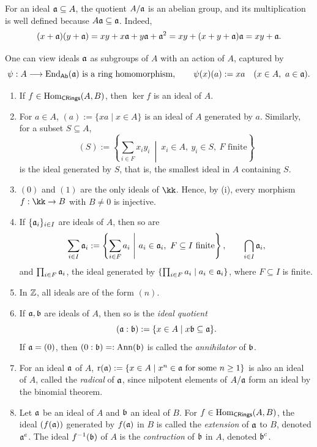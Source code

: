 \documentclass[11pt,a4paper]{article}
\begin{document}
\setcounter{definition}{2}\begin{definition}
For an ideal $\aa\subseteq A$, the quotient $A/\aa$ is an abelian group, and its multiplication is well defined because $A\aa\subseteq\aa$.
Indeed,
\[
(x+\aa)(y+\aa)=xy+x\aa+y\aa+\aa^2
=xy+(x+y+\aa)\aa=xy+\aa.
\]
\end{definition}
\begin{remark}
One can view ideals $\aa$ as subgroups of $A$ with an action of $A$, captured by
\[
\psi:A\longrightarrow\End_{\Ab}(\aa)\text{ is a ring homomorphism},\qquad
\psi(x)(a):=xa\quad(x\in A,\ a\in\aa).
\]

\end{remark}
\setcounter{example}{2}\begin{example}
\begin{enumerate}[label=(\roman*)]
\setcounter{enumi}{0}\item If $f\in\Hom_{\CRing}(A,B)$, then $\ker f$ is an ideal of $A$.
\setcounter{enumi}{1}\item For $a\in A$, $(a):=\{xa\mid x\in A\}$ is an ideal of $A$ generated by $a$. Similarly, for a subset $S\subseteq A$,
\[
(S):=\left\{\sum_{i\in F}x_i y_i\ \middle|\ x_i\in A,\ y_i\in S,\ F\text{ finite}\right\}
\]
is the ideal generated by $S$, that is, the smallest ideal in $A$ containing $S$.
\setcounter{enumi}{2}\item $(0)$ and $(1)$ are the only ideals of $\kk$. Hence, by (i), every morphism $f:\kk\to B$ with $B\ne0$ is injective.
\setcounter{enumi}{3}\item If $\{\aa_i\}_{i\in I}$ are ideals of $A$, then so are
\[
\sum_{i\in I}\aa_i:=\left\{\sum_{i\in F}a_i\ \middle|\ a_i\in\aa_i,\ F\subseteq I\text{ finite}\right\},
\qquad \bigcap_{i\in I}\aa_i,
\]
and $\prod_{i\in F}\aa_i$, the ideal generated by $\{\prod_{i\in F}a_i\mid a_i\in\aa_i\}$,
where $F\subseteq I$ is finite.
\setcounter{enumi}{4}\item In $\Z$, all ideals are of the form $(n)$.
\setcounter{enumi}{5}\item If $\aa,\bb$ are ideals of $A$, then so is the \emph{ideal quotient}
\[
(\aa:\bb):=\{x\in A\mid x\bb\subseteq\aa\}.
\]
If $\aa=(0)$, then $(0:\bb)=:\Ann(\bb)$ is called the \emph{annihilator} of $\bb$.
\setcounter{enumi}{6}\item For an ideal $\aa$ of $A$, $\rad(\aa):=\{x\in A\mid x^n\in\aa\text{ for some }n\geq1\}$ is also an ideal of $A$, called the \emph{radical} of $\aa$, since nilpotent elements of $A/\aa$ form an ideal by the binomial theorem.
\setcounter{enumi}{7}\item Let $\aa$ be an ideal of $A$ and $\bb$ an ideal of $B$. For $f\in\Hom_{\CRing}(A,B)$, the ideal $(f(\aa))$ generated by $f(\aa)$ in $B$ is called the \emph{extension} of $\aa$ to $B$, denoted $\aa^e$. The ideal $f^{-1}(\bb)$ of $A$ is the \emph{contraction} of $\bb$ in $A$, denoted $\bb^c$.
\end{enumerate}
\end{example}
\end{document}
